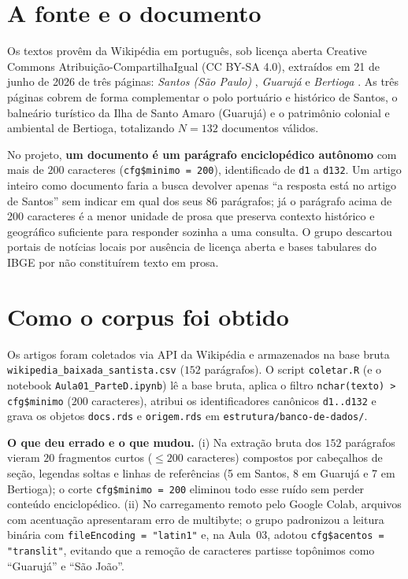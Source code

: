 \documentclass[
  article,
  12pt,
  oneside,
  a4paper,
  english,
  brazil
]{abntex2}\usepackage[]{graphicx}\usepackage[]{xcolor}
\begin{document}
\section{A fonte e o documento}

Os textos provêm da Wikipédia em português, sob licença aberta Creative
Commons Atribuição-CompartilhaIgual (CC BY-SA 4.0), extraídos em 21 de junho
de 2026 de três páginas: \textit{Santos (São Paulo)} \cite{wikisantos},
\textit{Guarujá} \cite{wikiguaruja} e \textit{Bertioga} \cite{wikibertioga}.
As três páginas cobrem de forma complementar o polo portuário e histórico de
Santos, o balneário turístico da Ilha de Santo Amaro (Guarujá) e o patrimônio
colonial e ambiental de Bertioga, totalizando $N = 132$
documentos válidos.

No projeto, \textbf{um documento é um parágrafo enciclopédico autônomo} com
mais de $200$ caracteres (\texttt{cfg\$minimo = 200}),
identificado de \texttt{d1} a \texttt{d132}. Um artigo inteiro como documento
faria a busca devolver apenas ``a resposta está no artigo de Santos'' sem
indicar em qual dos seus 86 parágrafos; já o parágrafo acima de 200
caracteres é a menor unidade de prosa que preserva contexto histórico e
geográfico suficiente para responder sozinha a uma consulta. O grupo descartou
portais de notícias locais por ausência de licença aberta e bases tabulares do
IBGE por não constituírem texto em prosa.

\section{Como o corpus foi obtido}

Os artigos foram coletados via API da Wikipédia e armazenados na base bruta
\texttt{wikipedia\_baixada\_santista.csv} ($152$
parágrafos). O script \texttt{coletar.R} (e o notebook \texttt{Aula01\_ParteD.ipynb})
lê a base bruta, aplica o filtro \texttt{nchar(texto) > cfg\$minimo}
($200$ caracteres), atribui os identificadores canônicos
\texttt{d1..d132} e grava os objetos \texttt{docs.rds} e \texttt{origem.rds}
em \texttt{estrutura/banco-de-dados/}.

\textbf{O que deu errado e o que mudou.} (i) Na extração bruta dos
$152$ parágrafos vieram $20$
fragmentos curtos ($\le 200$ caracteres) compostos por cabeçalhos de seção,
legendas soltas e linhas de referências (5 em Santos, 8 em Guarujá e 7 em
Bertioga); o corte \texttt{cfg\$minimo = 200} eliminou todo esse ruído sem
perder conteúdo enciclopédico. (ii) No carregamento remoto pelo Google Colab,
arquivos com acentuação apresentaram erro de multibyte; o grupo padronizou a
leitura binária com \texttt{fileEncoding = "latin1"} e, na Aula~03, adotou
\texttt{cfg\$acentos = "translit"}, evitando que a remoção de caracteres
partisse topônimos como ``Guarujá'' e ``São João''.
\end{document}

